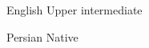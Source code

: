 

\begin{cvlanguages}

  \cvlanguage
    {English} %
    {Upper intermediate} %

  \cvlanguage
    {Persian} %
    {Native} %

\end{cvlanguages}